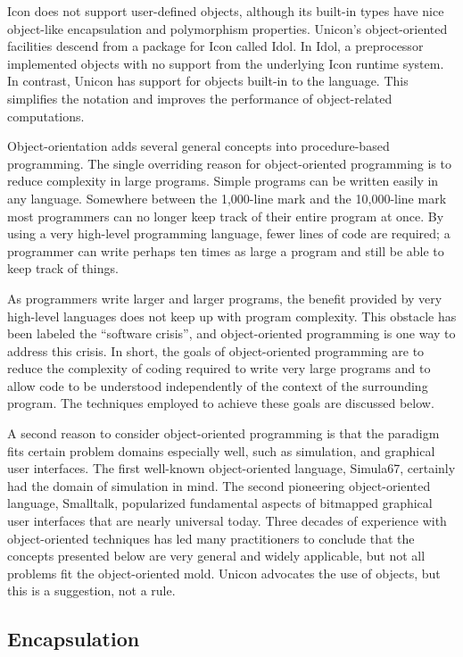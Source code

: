 Icon does not support user-defined objects, although its built-in types
have nice object-like encapsulation and polymorphism properties.
Unicon's object-oriented facilities descend from a
package for Icon called Idol. In Idol, a preprocessor
implemented objects with no support from the underlying Icon runtime
system. In contrast, Unicon has support for objects built-in to the
language. This simplifies the notation and improves the performance of
object-related computations.

Object-orientation adds several general concepts into procedure-based
programming. The single overriding reason for object-oriented programming is to reduce complexity in
large programs. Simple programs can be written easily in any language.
Somewhere between the 1,000-line mark and the 10,000-line mark most
programmers can no longer keep track of their entire program at once.
By using a very high-level programming language, fewer lines of code
are required; a programmer can write perhaps ten times as large a
program and still be able to keep track of things.

As programmers write larger and larger programs, the benefit provided by
very high-level languages does not keep
up with program complexity. This obstacle has been labeled the
``software crisis'', and object-oriented
programming is one way to address this crisis. In short, the goals of
object-oriented programming are to reduce the complexity of coding
required to write very large programs and to allow code to be
understood independently of the context of the surrounding program. The
techniques employed to achieve these goals are discussed below. 

A second reason to consider object-oriented programming is that the
paradigm fits certain problem domains especially well, such as
simulation, and graphical user interfaces. The first well-known
object-oriented language, Simula67, certainly had the
domain of simulation in mind. The second pioneering object-oriented
language, Smalltalk, popularized fundamental aspects of bitmapped
graphical user interfaces that are nearly universal today. Three
decades of experience with object-oriented techniques has led many
practitioners to conclude that the concepts presented below are very
general and widely applicable, but not all problems fit the
object-oriented mold. Unicon advocates the use of objects, but this is
a suggestion, not a rule. 

\subsection*{Encapsulation}

